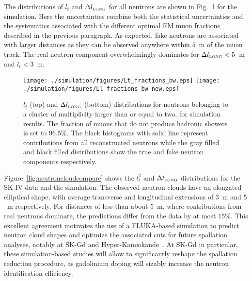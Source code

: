 \begin{tabular}{|c|c|c|c|}
 
\end{tabular} 

The distributions of $l_t$ and $\Delta l_{\mbox{\tiny LONG}}$ for all neutrons are shown in Fig.~\ref{fig:ncloudsimu} for the simulation. Here the uncertainties combine both the statistical uncertainties and the systematics associated with the different optimal EM muon fractions described in the previous paragraph. As expected, fake neutrons are associated with larger distances as they can be observed anywhere within $5$~m of the muon track. The real neutron component overwhelmingly dominates for $\Delta l_{\mbox{\tiny LONG}} < 5$~m and $l_t < 3$~m.

\begin{figure}
    \centering
    \texttt{[image: ./simulation/figures/Lt\_fractions\_bw.eps]}
    \texttt{[image: ./simulation/figures/Ll\_fractions\_bw\_new.eps]}
    \caption{$l_t$ (top) and $\Delta l_{\mbox{\tiny LONG}}$ (bottom) distributions for neutrons belonging to a cluster of multiplicity larger than or equal to two, for simulation results. The fraction of muons that do not produce hadronic showers is set to $96.5\%$. The black histograms with solid line represent contributions from all reconstructed neutrons while the gray filled and black filled distributions show the true and fake neutron components respectively.}
    \label{fig:ncloudsimu}
\end{figure}

Figure~\ref{fig:neutroncloudcompare} shows the $l_t^2$ and $\Delta l_{\mbox{\tiny LONG}}$ distributions for the SK-IV data and the simulation. The observed neutron clouds have an elongated elliptical shape, with average transverse and longitudinal extensions of $3$~m and $5$~m respectively. For distances of less than about 5~m, where contributions from real neutrons dominate, the predictions differ from the data by at most $15\%$. This excellent agreement motivates the use of a FLUKA-based simulation to predict neutron cloud shapes and optimize the associated cuts for future spallation analyses, notably at SK-Gd and Hyper-Kamiokande~\cite{HyperK}. At SK-Gd in particular, these simulation-based studies will allow to significantly reshape the spallation reduction procedure, as gadolinium doping will sizably increase the neutron identification efficiency.


